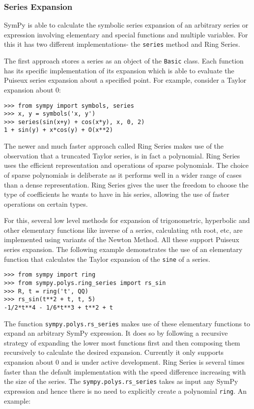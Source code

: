 \subsubsection{Series Expansion}

SymPy is able to calculate the symbolic series expansion of an arbitrary series
or expression involving elementary and special functions and multiple
variables. For this it has two different implementations- the \texttt{series}
method and Ring Series.

The first approach stores a series as an object of the \texttt{Basic} class.
Each function has its specific implementation of its expansion which is able to
evaluate the Puiseux series expansion about a specified point. For example,
consider a Taylor expansion about 0:

\begin{verbatim}
>>> from sympy import symbols, series
>>> x, y = symbols('x, y')
>>> series(sin(x+y) + cos(x*y), x, 0, 2)
1 + sin(y) + x*cos(y) + O(x**2)
\end{verbatim}

The newer and much faster\cite{sympyRingSeries} approach called Ring Series makes use of the
observation that a truncated Taylor series, is in fact a polynomial.
Ring Series uses the efficient representation and operations of sparse
polynomials. The choice of sparse polynomials is deliberate as it performs
well in a wider range of cases than a dense representation. Ring Series gives
the user the freedom to choose the type of coefficients he wants to have in
his series, allowing the use of faster operations on certain types.

For this, several low level methods for expansion of trigonometric, hyperbolic
and other elementary functions like inverse of a series, calculating $n$th
root, etc, are implemented using variants of the Newton\cite{zimmerman} Method.
All these support Puiseux series expansion. The following example demonstrates
the use of an elementary function that calculates the Taylor expansion of the
\texttt{sine} of a series.

\begin{verbatim}
>>> from sympy import ring
>>> from sympy.polys.ring_series import rs_sin
>>> R, t = ring('t', QQ)
>>> rs_sin(t**2 + t, t, 5)
-1/2*t**4 - 1/6*t**3 + t**2 + t
\end{verbatim}

The function \texttt{sympy.polys.rs\_series} makes use of these elementary
functions to expand an arbitrary SymPy expression. It does so by following a
recursive strategy of expanding the lower most functions first and then
composing them recursively to calculate the desired expansion. Currently it
only supports expansion about 0 and is under active development. Ring Series
is several times faster than the default implementation with the speed
difference increasing with the size of the series. The
\texttt{sympy.polys.rs\_series} takes as input any SymPy expression and hence
there is no need to explicitly create a polynomial \texttt{ring}. An example:

